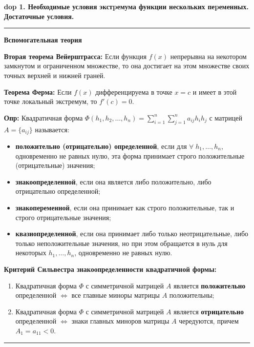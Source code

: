 \setcounter{section}{4}
\setcounter{subsection}{1}
\setcounter{equation}{0}
\textbf{\LARGE dop 1. Необходимые условия экстpемума функции нескольких пеpеменных. Достаточные условия.}

\rule{275pt}{0.5pt}
\begin{center}
    \textbf{Вспомогательная теория}
\end{center}

\textbf{Вторая теорема Вейерштрасса:} Если функция $f(x)$ непрерывна на некотором замкнутом и ограниченном множестве, то она достигает на этом множестве своих точных верхней и нижней граней.

\textbf{Теорема Ферма:} Если $f(x)$ дифференцируема в точке $x=c$ и имеет в этой точке локальный экстремум, то $f'(c) = 0$.  

\textbf{Опр:} Квадратичная форма $\Phi(h_1, h_2, \ldots, h_n) = \sum_{i=1}^n \sum_{j=1}^n a_{ij} h_i h_j$ с матрицей $A = \{a_{ij}\}$ называется:
\begin{itemize}
    \item \textbf{положительно (отрицательно) определенной}, если для $\forall \; h_1, \ldots, h_n$, одновременно не равных нулю, эта форма принимает строго положительные (отрицательные) значения;
    \item \textbf{знакоопределенной}, если она является либо положительно, либо отрицательно определенной;
    \item \textbf{знакопеременной}, если она принимает как строго положительные, так и строго отрицательные значения;
    \item \textbf{квазиопределенной}, если она принимает либо только неотрицательные, либо только неположительные значения, но при этом обращается в нуль для некоторых $h_1, \ldots, h_n$, одновременно не равных нулю.
\end{itemize}

\textbf{Критерий Сильвестра знакоопределенности квадратичной формы:}
\begin{enumerate}
    \item Квадратичная форма $\Phi$ с симметричной матрицей $A$ является \textbf{положительно} определенной $\Leftrightarrow$ все главные миноры матрицы $A$ положительны;
    \item Квадратичная форма $\Phi$ с симметричной матрицей $A$ является \textbf{отрицательно} определенной $\Leftrightarrow$ знаки главных миноров матрицы $A$ чередуются, причем $A_1 = a_{11} < 0$.
\end{enumerate}
\rule{275pt}{0.5pt} \\

